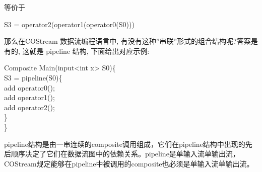等价于

\begin{algorithm}\label{algo:costream}
S3 = operator2(operator1(operator0(S0)))
\end{algorithm}

那么在COStream 数据流编程语言中, 有没有这种”串联”形式的组合结构呢?答案是有的, 这就是 pipeline 结构, 下面给出对应示例:

\begin{algorithm}\label{algo:costream}
Composite Main(input<int x> S0)\{\\
 \hspace*{1 pc} S3 = pipeline(S0)\{\\
 \hspace*{2 pc} add operator0();\\
 \hspace*{2 pc} add operator1();\\
 \hspace*{2 pc} add operator2();\\
 \hspace*{1 pc} \}\\
\}
\end{algorithm}

pipeline结构是由一串连续的composite调用组成，它们在pipeline结构中出现的先后顺序决定了它们在数据流图中的依赖关系。pipeline是单输入流单输出流，COStream规定能够在pipeline中被调用的composite也必须是单输入流单输出流。

